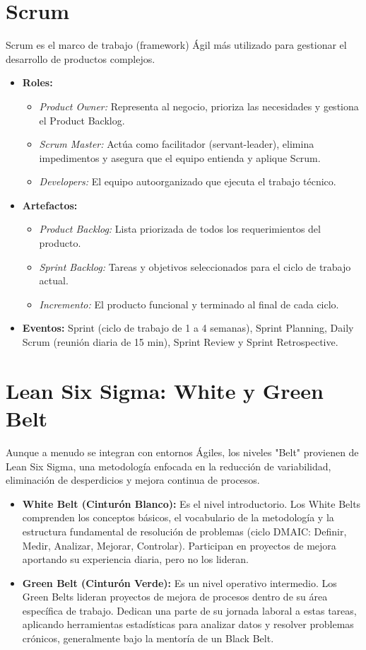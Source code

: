 \documentclass{llncs}
\begin{document}
\section{Scrum}
Scrum es el marco de trabajo (framework) Ágil más utilizado para gestionar el desarrollo de productos complejos.
\begin{itemize}
    \item \textbf{Roles:} 
    \begin{itemize}
        \item \emph{Product Owner:} Representa al negocio, prioriza las necesidades y gestiona el Product Backlog.
        \item \emph{Scrum Master:} Actúa como facilitador (servant-leader), elimina impedimentos y asegura que el equipo entienda y aplique Scrum.
        \item \emph{Developers:} El equipo autoorganizado que ejecuta el trabajo técnico.
    \end{itemize}
    \item \textbf{Artefactos:}
    \begin{itemize}
        \item \emph{Product Backlog:} Lista priorizada de todos los requerimientos del producto.
        \item \emph{Sprint Backlog:} Tareas y objetivos seleccionados para el ciclo de trabajo actual.
        \item \emph{Incremento:} El producto funcional y terminado al final de cada ciclo.
    \end{itemize}
    \item \textbf{Eventos:} Sprint (ciclo de trabajo de 1 a 4 semanas), Sprint Planning, Daily Scrum (reunión diaria de 15 min), Sprint Review y Sprint Retrospective.
\end{itemize}

\section{Lean Six Sigma: White y Green Belt}
Aunque a menudo se integran con entornos Ágiles, los niveles "Belt" provienen de Lean Six Sigma, una metodología enfocada en la reducción de variabilidad, eliminación de desperdicios y mejora continua de procesos.
\begin{itemize}
    \item \textbf{White Belt (Cinturón Blanco):} Es el nivel introductorio. Los White Belts comprenden los conceptos básicos, el vocabulario de la metodología y la estructura fundamental de resolución de problemas (ciclo DMAIC: Definir, Medir, Analizar, Mejorar, Controlar). Participan en proyectos de mejora aportando su experiencia diaria, pero no los lideran.
    \item \textbf{Green Belt (Cinturón Verde):} Es un nivel operativo intermedio. Los Green Belts lideran proyectos de mejora de procesos dentro de su área específica de trabajo. Dedican una parte de su jornada laboral a estas tareas, aplicando herramientas estadísticas para analizar datos y resolver problemas crónicos, generalmente bajo la mentoría de un Black Belt.
\end{itemize}
\end{document}
